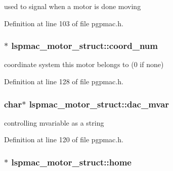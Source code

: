 used to signal when a motor is done moving 



Definition at line 103 of file pgpmac.\-h.

\hypertarget{structlspmac__motor__struct_a5614e003272e8323f8809bf7b6559532}{
\subsubsection[{coord\-\_\-num}]{$\ast$ lspmac\-\_\-motor\-\_\-struct\-::coord\-\_\-num}}\label{structlspmac__motor__struct_a5614e003272e8323f8809bf7b6559532}


coordinate system this motor belongs to (0 if none) 



Definition at line 128 of file pgpmac.\-h.

\hypertarget{structlspmac__motor__struct_a05dff021221abbc1bf656039fffb3275}{
\subsubsection[{dac\-\_\-mvar}]{\setlength{\rightskip}{0pt plus 5cm}char$\ast$ lspmac\-\_\-motor\-\_\-struct\-::dac\-\_\-mvar}}\label{structlspmac__motor__struct_a05dff021221abbc1bf656039fffb3275}


controlling mvariable as a string 



Definition at line 120 of file pgpmac.\-h.

\hypertarget{structlspmac__motor__struct_a6dc1ceab86687f741d4c4a574501959c}{
\subsubsection[{home}]{$\ast$ lspmac\-\_\-motor\-\_\-struct\-::home}}\label{structlspmac__motor__struct_a6dc1ceab86687f741d4c4a574501959c}


